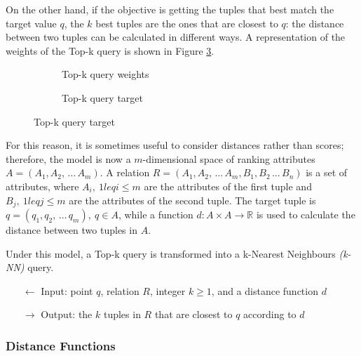 \documentclass[english]{article}
\begin{document}
On the other hand, if the objective is getting the tuples that best match the target value \(q\), the \(k\) best tuples are the ones that are closest to \(q\): the distance between two tuples can be calculated in different ways.
A representation of the weights of the Top-k query is shown in Figure \ref{subfig:topk-target}.

\begin{figure}[htbp]
  \centering
  \bigskip
  \begin{subfigure}[t]{0.495\textwidth}
    \centering
    \bigskip
    \caption{Top-k query weights}
    \label{subfig:topk-weights}
    \bigskip
  \end{subfigure}
  \begin{subfigure}[t]{0.495\textwidth}
    \centering
    \bigskip
    \caption{Top-k query target}
    \label{subfig:topk-target}
    \bigskip
  \end{subfigure}
  \bigskip
\end{figure}

For this reason, it is sometimes useful to consider distances rather than scores;
therefore, the model is now a \(m\)-dimensional space of ranking attributes \(A = \left( A_1, A_2, \,\ldots\, A_m \right)\).
A relation \(R = \left( A_1, A_2, \,\ldots\, A_m, B_1, B_2 \,\ldots\, B_n \right)\) is a set of attributes, where \(A_i, \ 1 leq i \leq m\) are the attributes of the first tuple and \(B_j, \ 1 leq j \leq m\) are the attributes of the second tuple.
The target tuple is \(q = \left( q_1, q_2, \,\ldots\, q_m \right),\ q \in A\), while a function \(d: A \times A \rightarrow \mathbb{R}\) is used to calculate the distance between two tuples in \(A\).

\bigskip
Under this model, a Top-k query is transformed into a k-Nearest Neighbours \textit{(k-NN)} query.

\begin{itemize}
  \item[\(\leftarrow\)] Input: point \(q\), relation \(R\), integer \(k \geq 1\), and a distance function \(d\)
  \item[\(\rightarrow\)] Output: the \(k\) tuples in \(R\) that are closest to \(q\) according to \(d\)
\end{itemize}

\subsubsection{Distance Functions}
\end{document}
